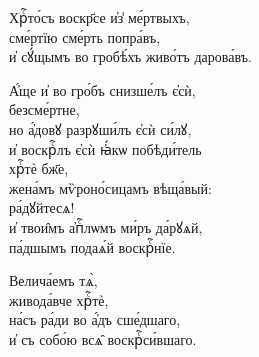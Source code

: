 \documentclass{article}
\begin{document}
%
Хрⷭ҇то́съ воскр҃се и҆з̾ ме́ртвыхъ, \\
сме́ртїю сме́рть попра́въ, \\
и҆ сꙋ́щымъ во гробѣ́хъ живо́тъ дарова́въ.


А҆́ще и҆ во гро́бъ снизше́лъ є҆сѝ, \\
        \cont безсме́ртне, \\
но а҆́довꙋ разрꙋши́лъ є҆сѝ си́лꙋ, \\
и҆ воскрⷭ҇лъ є҆сѝ ꙗ҆́кѡ побѣди́тель\\
        \cont хрⷭ҇тѐ бж҃е, \\
жена́мъ мѷроно́сицамъ вѣща́вый: \\
        \cont ра́дꙋйтесѧ! \\
и҆ твои̑мъ а҆пⷭ҇лѡмъ ми́ръ да́рꙋѧй, \\
па́дшымъ подаѧ́й воскрⷭ҇нїе.

Велича́емъ тѧ̀, \\
живода́вче хрⷭ҇тѐ, \\
на́съ ра́ди во а҆́дъ сше́дшаго, \\
и҆ съ собо́ю всѧ̑ воскрⷭ҇си́вшаго.
\end{document}
